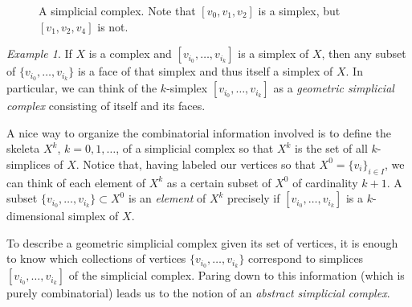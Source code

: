 \documentclass[12pt]{article}
\theoremstyle{plain}
\theoremstyle{definition}
\theoremstyle{remark}
\newtheorem{example}[theorem]{Example}
\begin{document}
\begin{figure}[!htp]
\begin{center}
\end{center}
\caption{A simplicial complex. Note that  $[v_0,v_1,v_2]$ is a simplex, but $[v_1,v_2,v_4]$ is not.}\label{F: fig1}
\end{figure}


\begin{example}\label{E: simplex/complex}
If $X$ is a complex and $[v_{i_0},\ldots, v_{i_k}]$ is a simplex of $X$, then any subset of $\{v_{i_0},\ldots, v_{i_k}\}$ is a face of that simplex and thus itself a simplex of $X$. In particular, we can think of the $k$-simplex $[v_{i_0},\ldots, v_{i_k}]$  as a  \emph{geometric simplicial complex} consisting of itself and its faces. 
\end{example}


A nice way to organize the combinatorial information involved is to define the skeleta $X^k$, $k=0,1,\ldots$, of a simplicial complex so that $X^k$ is the set of all $k$-simplices of $X$. Notice that, having labeled our vertices so that  $X^0=\{v_i\}_{i\in I}$, we can think of each element of $X^k$ as a certain subset of $X^0$ of cardinality $k+1$. A subset $\{v_{i_0},\ldots, v_{i_k}\}\subset X^0$ is an \emph{element} of $X^k$ precisely if $[v_{i_0},\ldots, v_{i_k}]$ is a $k$-dimensional simplex of $X$. 


To describe a geometric simplicial complex given its set of vertices, it is enough to know which collections of vertices $\{v_{i_0},\ldots, v_{i_k}\}$ correspond to simplices $[v_{i_0},\ldots, v_{i_k}]$ of the simplicial complex. Paring down to this information (which is purely combinatorial) 
leads us  to the notion of an \emph{abstract simplicial complex}. 
\end{document}
